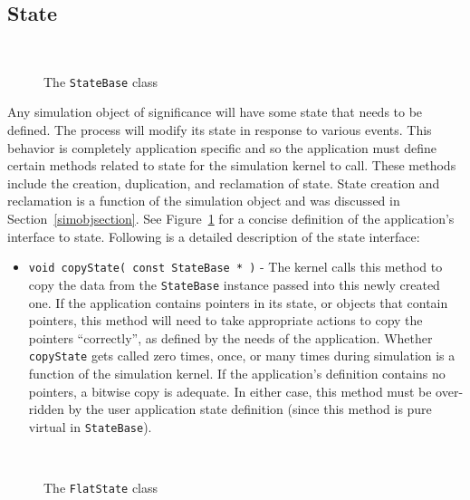 \documentclass[11pt]{article}
\begin{document}
\subsection{State}

\begin{figure}
\begin{center}
\ 
\end{center}
\caption{The {\tt StateBase} class}\label{fig:stateBase}
\end{figure}

Any simulation object of significance will have some state that needs to
be defined.  The process will modify its state in response to various
events.  This behavior is completely application specific and so the
application must define certain methods related to state for the
simulation kernel to call.  These methods include the creation,
duplication, and reclamation of state.  State creation and reclamation is
a function of the simulation object and was discussed in
Section~\ref{simobjsection}.  See Figure~\ref{fig:stateBase} for a concise
definition of the application's interface to state.  Following is a
detailed description of the state interface:

\begin{itemize}

\item{\tt void copyState( const StateBase * )}\label{copyState} - The
  kernel calls this method to copy the data from the {\tt StateBase}
  instance passed into this newly created one.  If the application
  contains pointers in its state, or objects that contain pointers, this
  method will need to take appropriate actions to copy the pointers
  ``correctly'', as defined by the needs of the application. Whether {\tt
  copyState} gets called zero times, once, or many times during simulation
  is a function of the simulation kernel.  If the application's definition
  contains no pointers, a bitwise copy is adequate. In either case, this
  method must be over-ridden by the user application state definition
  (since this method is pure virtual in {\tt StateBase}).

\end{itemize}

\begin{figure}[th]
\begin{center}
\ 
\end{center}
\caption{The {\tt FlatState} class}\label{fig:flatstate}
\end{figure}
\end{document}
